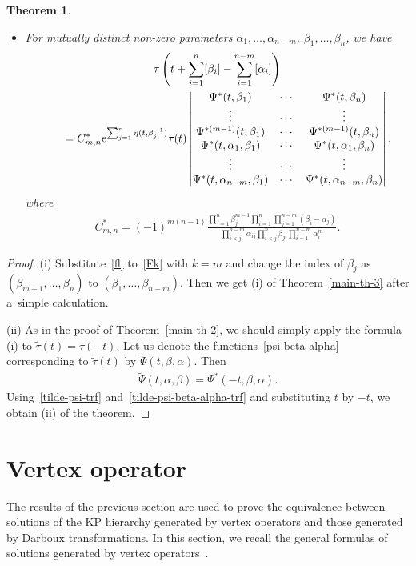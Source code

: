 \documentclass[pdftex]{sigma}
\numberwithin{equation}{section}
\newtheorem{Theorem}{Theorem}[section]
\theoremstyle{definition}
\begin{document}
\begin{Theorem}
\begin{itemize}
\item[$(ii)$] For mutually distinct non-zero parameters $\alpha_1,\dots ,\alpha_{n-m}$, $\beta_1,\dots ,\beta_n$, we have
\begin{gather*}
\tau\left(t+\sum_{i=1}^{n}[\beta_i]-\sum_{i=1}^{n-m}[\alpha_i]\right)\\
\qquad
=
C_{m,n}^\ast
{\rm e}^{\sum_{j=1}^n\eta(t,\beta_j^{-1})}
\tau(t)
\left|
\begin{matrix}
\Psi^\ast(t,\beta_1)&\cdots&\Psi^\ast(t,\beta_n)\\
\vdots&\cdots&\vdots\\
\Psi^{\ast(m-1)}(t,\beta_1)&\cdots&\Psi^{\ast(m-1)}(t,\beta_n)\\
\Psi^\ast(t,\alpha_1,\beta_1)&\cdots&\Psi^\ast(t,\alpha_1,\beta_n)\\
\vdots&\cdots&\vdots\\
\Psi^\ast(t,\alpha_{n-m},\beta_1)&\cdots&\Psi^\ast(t,\alpha_{n-m},\beta_n)\\
\end{matrix}
\right|,
\end{gather*}
where
\begin{gather*}
C^\ast_{m,n}=
(-1)^{m(n-1)}
\frac{\prod_{j=1}^n\beta_j^{m-1}\prod_{i=1}^{n}\prod_{j=1}^{n-m}(\beta_i-\alpha_j)}
{\prod_{i<j}^{n-m}\alpha_{ij}\prod_{i<j}^{n}\beta_{ji}\prod_{i=1}^{n-m}\alpha_i^m}.
\end{gather*}
\end{itemize}
\end{Theorem}


\begin{proof}
(i) Substitute~\eqref{fl} to~\eqref{Fk} with $k=m$ and change the index of $\beta_j$ as
$(\beta_{m+1},\dots ,\beta_n)$ to $(\beta_1,\dots ,\beta_{n-m})$. Then we get (i) of Theorem~\ref{main-th-3} after a~simple calculation.


(ii) As in the proof of Theorem~\ref{main-th-2}, we should simply apply the formula (i)
to $\tilde{\tau}(t)=\tau(-t)$. Let us denote the functions~\eqref{psi-beta-alpha}
corresponding to $\tilde{\tau}(t)$ by $\tilde{\Psi}(t,\beta,\alpha)$. Then
\begin{gather}
\tilde{\Psi}(t,\alpha,\beta)=\Psi^\ast(-t,\beta,\alpha).
\label{tilde-psi-beta-alpha-trf}
\end{gather}
Using~\eqref{tilde-psi-trf} and~\eqref{tilde-psi-beta-alpha-trf} and substituting $t$ by $-t$, we
obtain (ii) of the theorem.
\end{proof}

\section{Vertex operator}\label{sec3}
The results of the previous section are used to prove the equivalence
between solutions of the KP hierarchy generated by vertex operators and
those generated by Darboux transformations.
In this section, we recall the general formulas of solutions generated by vertex operators~\cite{Nak2024}.
\end{document}
